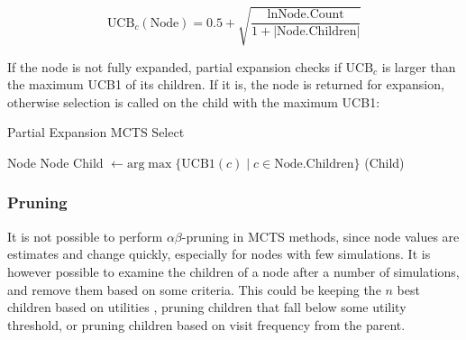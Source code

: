 \begin{equation}
    \label{eq:upper_confidence_child}
    \text{UCB}_c(\text{Node}) = 0.5 + \sqrt{\frac{\ln\text{Node.Count}}{1 + |\text{Node.Children}|}}
\end{equation}            

If the node is not fully expanded, partial expansion checks if
$\text{UCB}_c$ is larger than the maximum UCB1 of its children.
If it is, the node is returned for expansion, otherwise selection 
is called on the child with the maximum UCB1:
\begin{algorithm}
    \caption{Partial Expansion MCTS Select}
    \begin{algorithmic}[1]
                \State \Return Node
            \EndIf
            \State \Return Node
            \Else
            \State Child 
            $\gets \text{arg}\max \{ \text{UCB1}(c) \;|\; c \in \text{Node.Children} \}$ 
            \State \Return {}(Child)

            \EndIf
        \EndProcedure
    \end{algorithmic}        
\end{algorithm}

\subsubsection{Pruning}
It is not possible to perform $\alpha\beta$-pruning in MCTS methods, since node values are estimates and change quickly, especially for nodes with few simulations. It is however possible to examine the children of a node after a number of simulations, and remove them based on some criteria. This could be keeping the $n$ best children based on utilities \cite{Hsu2020}, pruning children that fall below some utility threshold, or pruning children based on visit frequency from the parent.
